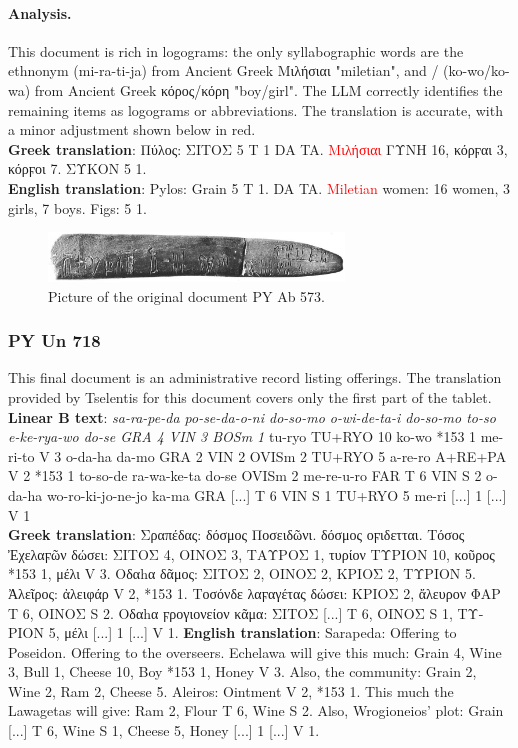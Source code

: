\paragraph{Analysis.}
This document is rich in logograms: the only syllabographic words are the ethnonym \textlinb{\Bmi\Bra\Bti\Bja} (mi-ra-ti-ja) from Ancient Greek \textgreek{Μιλήσιαι} "miletian", and \textlinb{\Bko\Bwo}/\textlinb{\Bko\Bwa} (ko-wo/ko-wa) from Ancient Greek \textgreek{κόρος/κόρη} "boy/girl".
The LLM correctly identifies the remaining items as logograms or abbreviations.
The translation is accurate, with a minor adjustment shown below in red. \\
\textbf{Greek translation}: \textgreek{Πύλος: ΣΙΤΟΣ 5 T 1 DA TA.} \textcolor{red}{\textgreek{Μιλήσιαι}} \textgreek{ΓΥΝΗ 16, κόρϝαι 3, κόρϝοι 7. ΣΥΚΟΝ 5 1.} \\
\textbf{English translation}: Pylos: Grain 5 T 1. DA TA. \textcolor{red}{Miletian} women: 16 women, 3 girls, 7 boys. Figs: 5 1.

\begin{figure}[H]
  \centering
  \includegraphics[width=0.7\textwidth]{Images/4611.png} %
  \caption{Picture of the original document PY Ab 573.}
  \label{fig:doc11}
\end{figure}

\subsubsection{PY Un 718} \label{doc:pyun718}
This final document is an administrative record listing offerings.
The translation provided by Tselentis for this document covers only the first part of the tablet. \\
\textbf{Linear B text}: \textit{sa-ra-pe-da po-se-da-o-ni do-so-mo o-wi-de-ta-i do-so-mo to-so e-ke-rya-wo do-se GRA 4 VIN 3 BOSm 1} tu-ryo TU+RYO 10 ko-wo *153 1 me-ri-to V 3 o-da-ha da-mo GRA 2 VIN 2 OVISm 2 TU+RYO 5 a-re-ro A+RE+PA V 2 *153 1 to-so-de ra-wa-ke-ta do-se OVISm 2 me-re-u-ro FAR T 6 VIN S 2 o-da-ha wo-ro-ki-jo-ne-jo ka-ma GRA [...] T 6 VIN S 1 TU+RYO 5 me-ri [...] 1 [...] V 1 \\
\textbf{Greek translation}: \textgreek{Σραπέδας: δόσμος Ποσειδῶνι. δόσμος οϝιδετται. Τόσος Ἐχελαϝῶν δώσει: ΣΙΤΟΣ 4, ΟΙΝΟΣ 3, ΤΑΥΡΟΣ 1, τυρίον ΤΥΡΙΟΝ 10, κοῦρος *153 1, μέλι V 3. Οδαhα δᾶμος: ΣΙΤΟΣ 2, ΟΙΝΟΣ 2, ΚΡΙΟΣ 2, ΤΥΡΙΟΝ 5. Ἀλεῖρος: ἀλειφάρ V 2, *153 1. Τοσόνδε λαϝαγέτας δώσει: ΚΡΙΟΣ 2, ἄλευρον ΦΑΡ T 6, ΟΙΝΟΣ S 2. Οδαhα ϝρογιονείον κᾶμα: ΣΙΤΟΣ [...] T 6, ΟΙΝΟΣ S 1, ΤΥΡΙΟΝ 5, μέλι [...] 1 [...] V 1.}
\textbf{English translation}: Sarapeda: Offering to Poseidon. Offering to the overseers. Echelawa will give this much: Grain 4, Wine 3, Bull 1, Cheese 10, Boy *153 1, Honey V 3. Also, the community: Grain 2, Wine 2, Ram 2, Cheese 5. Aleiros: Ointment V 2, *153 1. This much the Lawagetas will give: Ram 2, Flour T 6, Wine S 2. Also, Wrogioneios' plot: Grain [...] T 6, Wine S 1, Cheese 5, Honey [...] 1 [...] V 1.

